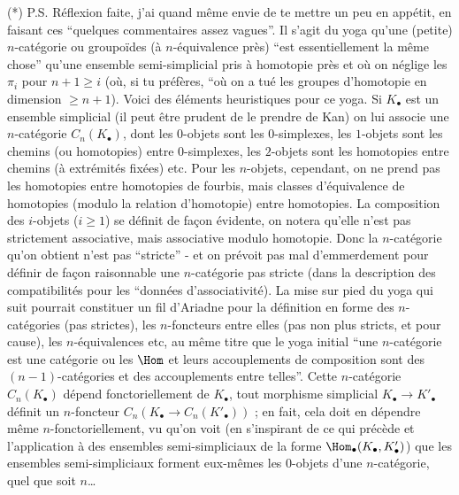 \label{sec:app3}%
(*) P.S. Réflexion faite, j'ai quand même envie de te mettre un peu en appétit, en faisant ces ``quelques commentaires assez vagues''. Il s'agit du yoga qu'une (petite) $n$-catégorie ou groupoïdes (à $n$-équivalence près) ``est essentiellement la même chose'' qu'une ensemble semi-simplicial pris à homotopie près et où on néglige les $\pi_i$ pour $n + 1 \geq i$ (où, si tu préfères, ``où on a tué les groupes d'homotopie en dimension $\geq n + 1$). Voici des éléments heuristiques pour ce yoga. Si $K_\bullet$ est un ensemble simplicial (il peut être prudent de le prendre de Kan) on lui associe une $n$-catégorie $C_n(K_\bullet)$, dont les $0$-objets sont les $0$-simplexes, les $1$-objets sont les chemins (ou homotopies) entre $0$-simplexes, les $2$-objets sont les homotopies entre chemins (à extrémités fixées) etc. Pour les $n$-objets, cependant, on ne prend pas les homotopies entre homotopies de fourbis, mais classes d'équivalence de homotopies (modulo la relation d'homotopie) entre homotopies. La composition des $i$-objets ($i \geq 1$) se définit de fa\c{c}on évidente, on notera qu'elle n'est pas strictement associative, mais associative modulo homotopie. Donc la $n$-catégorie qu'on obtient n'est pas ``stricte'' - et on prévoit pas mal d'emmerdement pour définir de fa\c{c}on raisonnable une $n$-catégorie pas stricte (dans la description des compatibilités pour les ``données d'associativité). La mise sur pied du yoga qui suit pourrait constituer un fil d'Ariadne pour la définition en forme des $n$-catégories (pas strictes), les $n$-foncteurs entre elles (pas non plus stricts, et pour cause), les $n$-équivalences etc, au même titre que le yoga initial ``une $n$-catégorie est une catégorie ou les $\Hom$ et leurs accouplements de composition sont des $(n-1)$-catégories et des accouplements entre telles''. Cette $n$-catégorie $C_n(K_{\bullet})$ dépend fonctoriellement de $K_{\bullet}$, tout morphisme simplicial $K_{\bullet} \to K'_{\bullet}$ définit un $n$-foncteur $C_n(K_{\bullet} \to C_n(K'_{\bullet}))$ ; en fait, cela doit en dépendre même $n$-fonctoriellement, vu qu'on voit (en s'inspirant de ce qui précède et l'application à des ensembles semi-simpliciaux de la forme $\Hom_{\bullet}(K_{\bullet}, K'_{\bullet})$) que les ensembles semi-simpliciaux forment eux-mêmes les $0$-objets d'une $n$-catégorie, quel que soit $n$\dots

